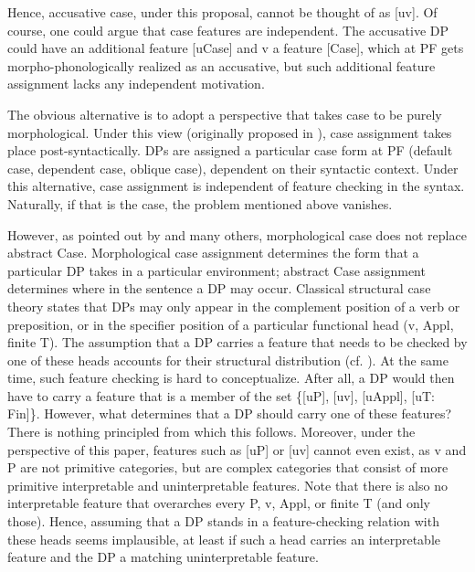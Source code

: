 \documentclass[output=paper
,modfonts
,nonflat]{langsci/langscibook}
\begin{document}
\noindent Hence, accusative case, under this proposal, cannot be thought of as [uv]. Of course, one could argue that case features are independent. The accusative DP could have an additional feature [uCase] and v a feature [Case], which at PF gets morpho-phonologically realized as an accusative, but such additional feature assignment lacks any independent motivation.

The obvious alternative is to adopt a perspective that takes case to be purely morphological. Under this view (originally proposed in \citealt{Marantz1991}), case assignment takes place post-syntactically. DPs are assigned a particular case form at PF (default case, dependent case, oblique case), dependent on their syntactic context. Under this alternative, case assignment is independent of feature checking in the syntax. Naturally, if that is the case, the problem mentioned above vanishes.

However, as pointed out by \citet{Legate2008} and many others, morphological case does not replace abstract Case. Morphological case assignment determines the form that a particular DP takes in a particular environment; abstract Case assignment determines where in the sentence a DP may occur. Classical structural case theory states that DPs may only appear in the complement position of a verb or preposition, or in the specifier position of a particular functional head (v, Appl, finite T). The assumption that a DP carries a feature that needs to be checked by one of these heads accounts for their structural distribution (cf. \citealt{Chomsky1995, Chomsky2001}). At the same time, such feature checking is hard to conceptualize. After all, a DP would then have to carry a feature that is a member of the set \{[uP], [uv], [uAppl], [uT: Fin]\}. However, what determines that a DP should carry one of these features? There is nothing principled from which this follows. Moreover, under the perspective of this paper, features such as [uP] or [uv] cannot even exist, as v and P are not primitive categories, but are complex categories that consist of more primitive interpretable and uninterpretable features. Note that there is also no interpretable feature that overarches every P, v, Appl, or finite T (and only those). Hence, assuming that a DP stands in a feature-checking relation with these heads seems implausible, at least if such a head carries an interpretable feature and the DP a matching uninterpretable feature.
\end{document}
